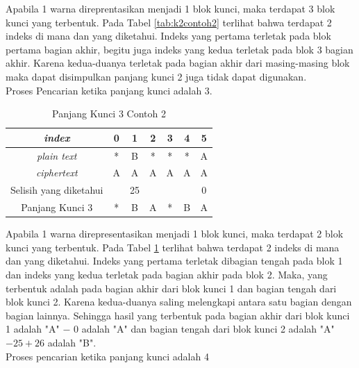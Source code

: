 	Apabila 1 warna direprentasikan menjadi 1 blok kunci, maka terdapat 3 blok kunci yang terbentuk. Pada Tabel \ref{tab:k2contoh2} terlihat bahwa terdapat 2 indeks di mana \plaintext dan \ciphertext yang diketahui. Indeks yang pertama terletak pada blok pertama bagian akhir, begitu juga indeks yang kedua terletak pada blok 3 bagian akhir. Karena kedua-duanya terletak pada bagian akhir dari masing-masing blok maka dapat disimpulkan panjang kunci 2 juga tidak dapat digunakan.
	\\
	Proses Pencarian ketika panjang kunci adalah 3.
	\begin{table}[H]
	 	\centering
	 	\caption{Panjang Kunci 3 Contoh 2}
	 	\setlength{\arrayrulewidth}{.08em}
	 	\begin{tabular}{|c|c|c|c|c|c|c|}\hline
		\textit{index}&0&1&2&3&4&5\\ \hline
	 	\textit{plain text}&\cellcolor{blue!15}*&\cellcolor{blue!15}B&\cellcolor{blue!15}*&\cellcolor{green!15}*&\cellcolor{green!15}*&\cellcolor{green!15}A\\ \hline
	 	\textit{ciphertext}&\cellcolor{blue!15}A&\cellcolor{blue!15}A&\cellcolor{blue!15}A&\cellcolor{green!15}A&\cellcolor{green!15}A&\cellcolor{green!15}A\\ \hline
	 	Selisih yang diketahui& &25& & & &0\\ \hline
	 	Panjang Kunci 3 &*&B&A&*&B&A \\ \hline
	 	\end{tabular}
	 	\label{tab:k3contoh2}
	\end{table}	
	Apabila 1 warna direpresentasikan menjadi 1 blok kunci, maka terdapat 2 blok kunci yang terbentuk. Pada Tabel \ref{tab:k3contoh2} terlihat bahwa terdapat 2 indeks di mana \plaintext dan \ciphertext yang diketahui. Indeks yang pertama terletak dibagian tengah pada blok 1 dan indeks yang kedua terletak pada bagian akhir pada blok 2. Maka,  \plaintext yang terbentuk adalah pada bagian akhir dari blok kunci 1 dan bagian tengah dari blok kunci 2. Karena kedua-duanya saling melengkapi antara satu bagian dengan bagian lainnya. Sehingga hasil yang terbentuk pada bagian akhir dari blok kunci 1 adalah "A" $-$ $0$ adalah "A" dan bagian tengah dari blok kunci 2 adalah "A" $- 25+26$ adalah "B". 
	\\
	Proses pencarian ketika panjang kunci adalah 4

